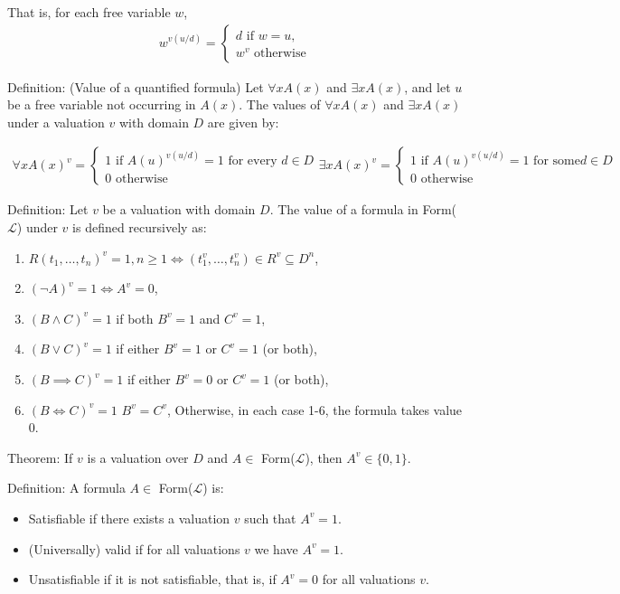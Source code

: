 \documentclass{article}
\begin{document}
That is, for each free variable $w$,
\begin{align*}
w^{v(u/d)} = \begin{cases}
d \text{ if } w = u, \\
w^v \text{ otherwise}
\end{cases}
\end{align*}

Definition: (Value of a quantified formula) Let $\forall x A(x)$ and $\exists x A(x)$, and let $u$ be a free variable not occurring in $A(x)$. The values of $\forall x A(x)$ and $\exists x A(x)$ under a valuation $v$ with domain $D$ are given by:

\begin{align*}
\forall x A(x)^v = \begin{cases}
1 \text{ if } A(u)^{v(u/d)} = 1 \text{ for every } d \in D \\
0 \text{ otherwise}
\end{cases}
\exists x A(x)^v = \begin{cases}
1 \text{ if } A(u)^{v(u/d)} = 1 \text{ for some} d \in D \\
0 \text{ otherwise}
\end{cases}
\end{align*}

Definition: Let $v$ be a valuation with domain $D$. The value of a formula in Form($\mathcal{L}$) under $v$ is defined recursively as:
\begin{enumerate}
    \item $R(t_1, \ldots, t_n)^v = 1, n \ge 1 \iff (t^v_1, \ldots, t^v_n) \in R^v \subseteq D^n$,
    \item $(\neg A)^v = 1 \iff A^v = 0$,
    \item $(B \wedge C)^v = 1$ if both $B^v = 1$ and $C^v = 1$, 
    \item $(B \vee C)^v = 1$ if either $B^v = 1$ or $C^v = 1$ (or both),
    \item $(B \implies C)^v = 1$ if either $B^v = 0$ or $C^v = 1$ (or both),
    \item $(B \iff C)^v = 1$ $B^v = C^v$, Otherwise, in each case 1-6, the formula takes value $0$.
\end{enumerate}

Theorem: If $v$ is a valuation over $D$ and $A \in $ Form($\mathcal{L}$), then $A^v \in \{0,1\}$.

Definition: A formula $A \in $ Form($\mathcal{L}$) is:
\begin{itemize}
    \item Satisfiable if there exists a valuation $v$ such that $A^v = 1$.
    \item (Universally) valid if for all valuations $v$ we have $A^v = 1$.
    \item Unsatisfiable if it is not satisfiable, that is, if $A^v = 0$ for all valuations $v$.
\end{itemize}
\end{document}
